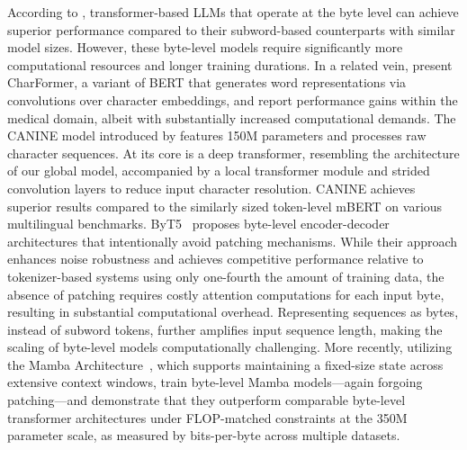 According to \cite{Choe2019BridgingTG}, transformer-based LLMs that operate at the byte level can achieve superior performance compared to their subword-based counterparts with similar model sizes. However, these byte-level models require significantly more computational resources and longer training durations. In a related vein, \cite{el2020characterbert} present CharFormer, a variant of BERT that generates word representations via convolutions over character embeddings, and report performance gains within the medical domain, albeit with substantially increased computational demands. The CANINE model introduced by \cite{clark2022canine} features 150M parameters and processes raw character sequences. At its core is a deep transformer, resembling the architecture of our global model, accompanied by a local transformer module and strided convolution layers to reduce input character resolution. CANINE achieves superior results compared to the similarly sized token-level mBERT on various multilingual benchmarks. ByT5~\citep{xue2022byt5} proposes byte-level encoder-decoder architectures that intentionally avoid patching mechanisms. While their approach enhances noise robustness and achieves competitive performance relative to tokenizer-based systems using only one-fourth the amount of training data, the absence of patching requires costly attention computations for each input byte, resulting in substantial computational overhead. Representing sequences as bytes, instead of subword tokens, further amplifies input sequence length, making the scaling of byte-level models computationally challenging. More recently, utilizing the Mamba Architecture~\citep{gu2023mamba}, which supports maintaining a fixed-size state across extensive context windows, \cite{wang2024mambabyte} train byte-level Mamba models—again forgoing patching—and demonstrate that they outperform comparable byte-level transformer architectures under FLOP-matched constraints at the 350M parameter scale, as measured by bits-per-byte across multiple datasets.

